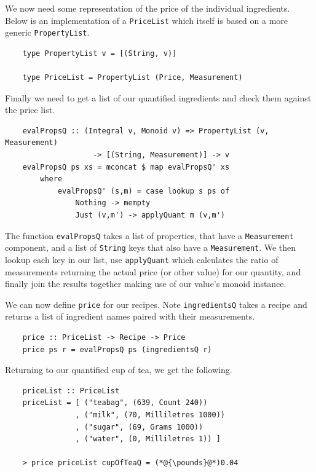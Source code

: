 \documentclass[11pt]{article}
\begin{document}
We now need some representation of the price of the individual ingredients.
Below is an implementation of a \texttt{PriceList} which itself is based on
a more generic \texttt{PropertyList}.

\begin{lstlisting}
    type PropertyList v = [(String, v)]

    type PriceList = PropertyList (Price, Measurement)
\end{lstlisting}

Finally we need to get a list of our quantified ingredients and check them
against the price list.

\begin{lstlisting}
    evalPropsQ :: (Integral v, Monoid v) => PropertyList (v, Measurement)
                    -> [(String, Measurement)] -> v
    evalPropsQ ps xs = mconcat $ map evalPropsQ' xs
        where
            evalPropsQ' (s,m) = case lookup s ps of
                Nothing -> mempty
                Just (v,m') -> applyQuant m (v,m')
\end{lstlisting}

The function \texttt{evalPropsQ} takes a list of properties, that have a \texttt{Measurement}
component, and a list of \texttt{String} keys that also have a \texttt{Measurement}.
We then lookup each key in our list, use \texttt{applyQuant} which calculates the ratio
of measurements returning the actual price (or other value) for our quantity, and finally
join the results together making use of our value's monoid instance.

\medbreak

We can now define \texttt{price} for our recipes. Note \texttt{ingredientsQ} takes a recipe
and returns a list of ingredient names paired with their measurements.

\begin{lstlisting}
    price :: PriceList -> Recipe -> Price
    price ps r = evalPropsQ ps (ingredientsQ r)
\end{lstlisting}

Returning to our quantified cup of tea, we get the following.

\begin{lstlisting}
    priceList :: PriceList
    priceList = [ ("teabag", (639, Count 240))
                , ("milk", (70, Milliletres 1000))
                , ("sugar", (69, Grams 1000))
                , ("water", (0, Milliletres 1)) ]

    > price priceList cupOfTeaQ = (*@{\pounds}@*)0.04
\end{lstlisting}
\end{document}
